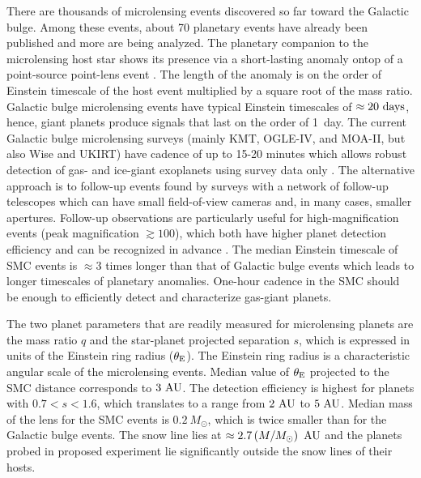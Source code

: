 \documentclass[12pt,letterpaper]{article}
\begin{document}
There are thousands of microlensing events discovered so far toward 
the Galactic bulge.  Among these events, about 70 planetary events have 
already been published and more are being analyzed.  
The planetary companion to the microlensing host star shows its presence via 
a short-lasting anomaly \citep{mao91,gould92} ontop of 
a point-source point-lens event \citep{paczynski86}.  The length of 
the anomaly is on the order of Einstein timescale of the host event 
multiplied by a square root of the mass ratio.  Galactic bulge microlensing 
events have typical Einstein timescales of $\approx20~{\rm days}$, hence, 
giant planets produce signals that last on the order of 1~day.  
The current Galactic bulge microlensing surveys 
(mainly KMT, OGLE-IV, and MOA-II, but also Wise and UKIRT) 
have cadence of up to 15-20 minutes which allows robust detection of gas- and ice-giant 
exoplanets using survey data only \citep[e.g.,][]{yee12,poleski14c,shvartzvald16a}.  
The alternative approach is to follow-up events found by surveys with a network of 
follow-up telescopes which can have small field-of-view cameras and, 
in many cases, smaller apertures.  Follow-up observations are particularly useful for 
high-magnification events (peak magnification $\gtrsim100$), 
which both have higher planet detection efficiency and can be 
recognized in advance \citep{griest98,gould10}.  The median Einstein timescale of 
SMC events is $\approx3$ times longer than that of Galactic bulge events which leads to 
longer timescales of planetary anomalies.  One-hour cadence in the SMC 
should be enough to efficiently detect and characterize gas-giant planets.  

The two planet parameters that are readily measured for microlensing planets 
are the mass ratio $q$ and the star-planet projected separation $s$, 
which is expressed in units of the Einstein ring radius ($\theta_{\rm E}$).  
The Einstein ring radius is a characteristic angular scale of 
the microlensing events.  Median value of $\theta_{\rm E}$ projected 
to the SMC distance corresponds to $3~{\rm AU}$.  The detection efficiency 
is highest for planets with $0.7 < s < 1.6$, which translates to 
a range from $2~{\rm AU}$ to $5~{\rm AU}$.  Median mass of the lens for 
the SMC events is $0.2~M_{\odot}$, which is twice smaller than for 
the Galactic bulge events.  The snow line lies at 
$\approx 2.7 \left(M/M_{\odot}\right)~{\rm AU}$ and the planets 
probed in proposed experiment lie significantly outside 
the snow lines of their hosts. 
\end{document}
